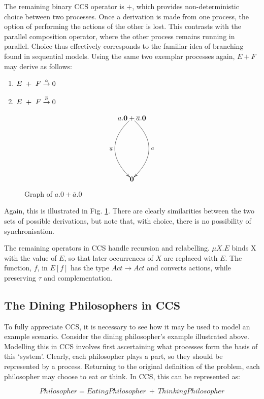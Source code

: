 The remaining binary CCS operator is $+$, which provides
non-deterministic choice between two processes.  Once a derivation is
made from one process, the option of performing the actions of the
other is lost.  This contrasts with the parallel composition operator,
where the other process remains running in parallel.  Choice thus
effectively corresponds to the familiar idea of branching found in
sequential models.  Using the same two exemplar processes again, $E +
F$ may derive as follows:

\begin{enumerate}
\item $E\ +\ F \stackrel{a}{\rightarrow} 0$
\item $E\ +\ F \stackrel{\overline{a}}{\rightarrow} 0$
\end{enumerate}


\begin{figure}  
  \centering
\[
\xy
(20,0)*{a.\nil + \overline{a}.\nil}="1";
(20,-30)*{\nil}="2";
{\ar@/^2pc/^{a} "1";"2"};
{\ar@/_2pc/_{\overline{a}} "1";"2"};
\endxy
\]
  \caption{Graph of $a.0 + \overline{a}.0$}
  \label{fig:graph2}
\end{figure}

Again, this is illustrated in Fig. \ref{fig:graph2}.  There are clearly
similarities between the two sets of possible derivations, but note
that, with choice, there is no possibility of synchronisation.

The remaining operators in CCS handle recursion and relabelling.  $\mu
X.E$ binds X with the value of $E$, so that later occurrences of $X$ are
replaced with $E$.  The function, $f$, in $E[f]$ has the type $Act
\rightarrow Act$ and converts actions, while preserving $\tau$ and
complementation.

\subsection{The Dining Philosophers in CCS}

To fully appreciate CCS, it is necessary to see how it may be used to
model an example scenario.  Consider the dining philosopher's example
illustrated above. Modelling this in CCS involves first ascertaining
what processes form the basis of this `system'.  Clearly, each
philosopher plays a part, so they should be represented by a process.
Returning to the original definition of the problem, each philosopher
may choose to eat or think.  In CCS, this can be represented as:

\begin{equation}
Philosopher = EatingPhilosopher\ +\ ThinkingPhilosopher
\end{equation}

